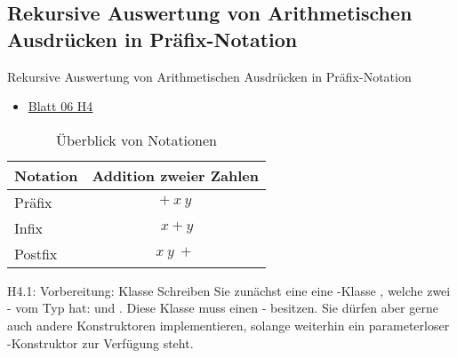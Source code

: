 \documentclass{../tuda-beamer}
\begin{document}
    \subsection{Rekursive Auswertung von Arithmetischen Ausdrücken in Präfix-Notation}
    \begin{frame}{Rekursive Auswertung von Arithmetischen Ausdrücken in Präfix-Notation}
        \begin{itemize}
            \item \href{https://moodle.informatik.tu-darmstadt.de/pluginfile.php/202303/mod_resource/content/3/uebung06.pdf}{Blatt 06 H4}
        \end{itemize}

        \begin{table}[h]
            \centering
            \begin{tabular}{lc}
                \toprule
                \textbf{Notation} & \textbf{Addition zweier Zahlen}
                \\
                \midrule
                Präfix & \(+ \ x \ y\)
                \\
                Infix & \(\ x + y\)
                \\
                Postfix & \(x \ y \ +\)
                \\
                \bottomrule
            \end{tabular}
            \caption{Überblick von Notationen}
        \end{table}
    \end{frame}

    \begin{frame}[c]{H4.1: Vorbereitung: Klasse }
        Schreiben Sie zunächst eine eine -Klasse
        , welche zwei
        - vom Typ  hat:
         und . Diese Klasse muss
        einen  - besitzen.
        Sie dürfen aber gerne auch andere Konstruktoren implementieren, solange weiterhin ein
        parameterloser -Konstruktor zur Verfügung steht.
    \end{frame}

    \begin{frame}
        
    \end{frame}
\end{document}
